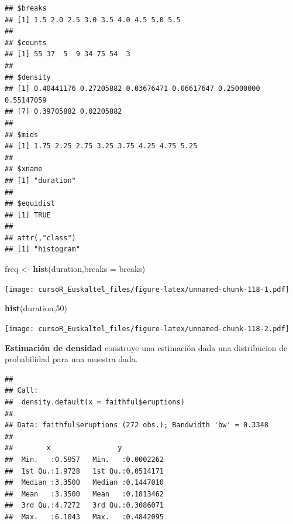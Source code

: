 \documentclass[]{book}
\newenvironment{Shaded}{\begin{snugshade}}{\end{snugshade}}
\newcommand{\KeywordTok}[1]{\textcolor[rgb]{0.13,0.29,0.53}{\textbf{#1}}}
\newcommand{\DataTypeTok}[1]{\textcolor[rgb]{0.13,0.29,0.53}{#1}}
\newcommand{\DecValTok}[1]{\textcolor[rgb]{0.00,0.00,0.81}{#1}}
\newcommand{\StringTok}[1]{\textcolor[rgb]{0.31,0.60,0.02}{#1}}
\newcommand{\OperatorTok}[1]{\textcolor[rgb]{0.81,0.36,0.00}{\textbf{#1}}}
\newcommand{\NormalTok}[1]{#1}
\begin{document}
\begin{verbatim}
## $breaks
## [1] 1.5 2.0 2.5 3.0 3.5 4.0 4.5 5.0 5.5
## 
## $counts
## [1] 55 37  5  9 34 75 54  3
## 
## $density
## [1] 0.40441176 0.27205882 0.03676471 0.06617647 0.25000000 0.55147059
## [7] 0.39705882 0.02205882
## 
## $mids
## [1] 1.75 2.25 2.75 3.25 3.75 4.25 4.75 5.25
## 
## $xname
## [1] "duration"
## 
## $equidist
## [1] TRUE
## 
## attr(,"class")
## [1] "histogram"
\end{verbatim}

\begin{Shaded}
\begin{Highlighting}[]
\NormalTok{freq <-}\StringTok{ }\KeywordTok{hist}\NormalTok{(duration,}\DataTypeTok{breaks =}\NormalTok{ breaks)}
\end{Highlighting}
\end{Shaded}

\texttt{[image: cursoR\_Euskaltel\_files/figure-latex/unnamed-chunk-118-1.pdf]}

\begin{Shaded}
\begin{Highlighting}[]
\KeywordTok{hist}\NormalTok{(duration,}\DecValTok{50}\NormalTok{)}
\end{Highlighting}
\end{Shaded}

\texttt{[image: cursoR\_Euskaltel\_files/figure-latex/unnamed-chunk-118-2.pdf]}

\textbf{Estimación de densidad} construye una estimación dada una
distribucion de probabilidad para una muestra dada.

\begin{Shaded}
\end{Shaded}

\begin{verbatim}
## 
## Call:
##  density.default(x = faithful$eruptions)
## 
## Data: faithful$eruptions (272 obs.); Bandwidth 'bw' = 0.3348
## 
##        x                y            
##  Min.   :0.5957   Min.   :0.0002262  
##  1st Qu.:1.9728   1st Qu.:0.0514171  
##  Median :3.3500   Median :0.1447010  
##  Mean   :3.3500   Mean   :0.1813462  
##  3rd Qu.:4.7272   3rd Qu.:0.3086071  
##  Max.   :6.1043   Max.   :0.4842095
\end{verbatim}
\end{document}
